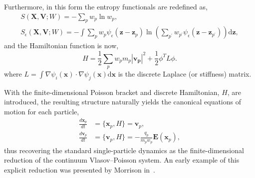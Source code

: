 \documentclass[preprint,12pt]{elsarticle}
\theoremstyle{definition}
\begin{document}
Furthermore, in this form the entropy functionals are redefined as,
\begin{gather}
S(\boldsymbol{X}, \boldsymbol{V} ; W)=-\sum_{p} w_{p} \ln w_p, \label{eq:DiscEntropy}\\
S_{\epsilon}(\boldsymbol{X}, \boldsymbol{V} ; W)=-\int \sum_{p} w_{p} \psi_{\epsilon}\left(\boldsymbol{z}-\boldsymbol{z}_{p}\right) \ln \left(\sum_{p^{\prime}} w_{p^{\prime}} \psi_{\epsilon}\left(\boldsymbol{z}-\boldsymbol{z}_{p^{\prime}}\right)\right) \mathrm{d} \boldsymbol{z},\label{eq:DiscRegEntropy}
\end{gather}
and the Hamiltonian function is now,
\begin{equation}\label{eq:DiscHamiltonian}
  H = \frac{1}{2} \sum_p w_p m_p \left|\boldsymbol{\boldsymbol{v}_p}\right|^2 + \frac{1}{2} \phi^T L \phi.
\end{equation}
where $L = \int \nabla \psi_i (\boldsymbol{x}) \cdot \nabla \psi_j (\boldsymbol{x}) \mathrm{d} \boldsymbol{x}$ is the discrete Laplace (or stiffness) matrix.

With the finite-dimensional Poisson bracket and discrete Hamiltonian, $H$, are introduced, the resulting structure naturally yields the canonical equations of motion for each particle, 
\begin{align}
  \frac{d\boldsymbol{x}_p}{dt} &= \{\boldsymbol{x}_p,H\} = \boldsymbol{v}_p, \\
  \frac{d\boldsymbol{v}_p}{dt} &= \{\boldsymbol{v}_p, H\} = -\frac{q_p}{m_p w_p} \boldsymbol{E}(\boldsymbol{x}_p),
\end{align}
thus recovering the standard single-particle dynamics as the finite-dimensional reduction of the continuum Vlasov–Poisson system.
An early example of this explicit reduction was presented by Morrison in~\cite{Morrison1981}.
\end{document}
